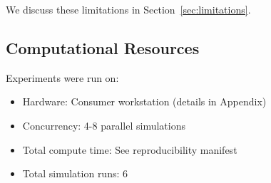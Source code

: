 We discuss these limitations in Section~\ref{sec:limitations}.

\subsection{Computational Resources}

Experiments were run on:
\begin{itemize}
    \item Hardware: Consumer workstation (details in Appendix)
    \item Concurrency: 4-8 parallel simulations
    \item Total compute time: See reproducibility manifest
    \item Total simulation runs: 6
\end{itemize}
